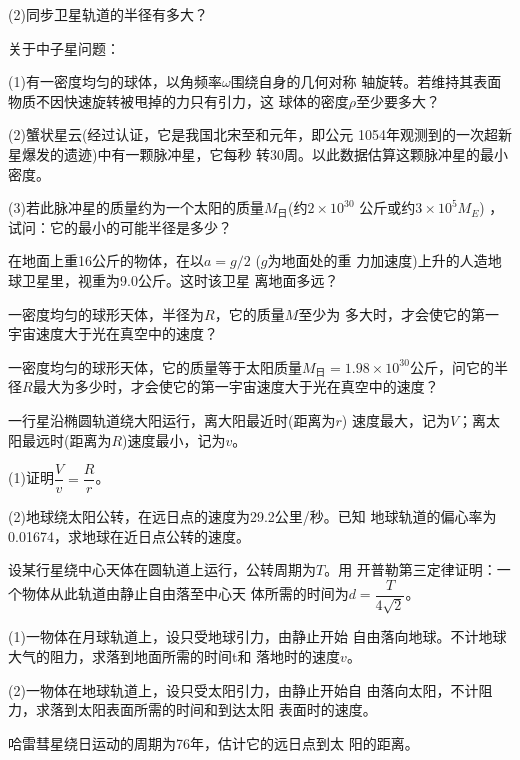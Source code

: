 \begin{exercises}
(2)同步卫星轨道的半径有多大？

\exercise 关于中子星问题：

(1)有一密度均匀的球体，以角频率$ \omega $围绕自身的几何对称
轴旋转。若维持其表面物质不因快速旋转被甩掉的力只有引力，这
球体的密度$ \rho $至少要多大？

(2)蟹状星云(经过认证，它是我国北宋至和元年，即公元
1054年观测到的一次超新星爆发的遗迹)中有一颗脉冲星，它每秒
转30周。以此数据估算这颗脉冲星的最小密度。

(3)若此脉冲星的质量约为一个太阳的质量$ M _ \text{日} $(约$ 2 \times 1 0 ^ { 3 0 } $
公斤或约$ 3 \times 1 0 ^ { 5 } M _ { E } $) ，试问：它的最小的可能半径是多少？

\exercise 在地面上重16公斤的物体，在以$ a = g / 2 $ ($ g $为地面处的重
力加速度)上升的人造地球卫星里，视重为9.0公斤。这时该卫星
离地面多远？

\exercise 一密度均匀的球形天体，半径为$ R $，它的质量$ M $至少为
多大时，才会使它的第一宇宙速度大于光在真空中的速度？

\exercise 一密度均匀的球形天体，它的质量等于太阳质量$ M _ \text{日} =
  1. 9 8 \times 1 0 ^ { 3 0 } $公斤，问它的半径$ R $最大为多少时，才会使它的第一宇宙速度大于光在真空中的速度？

\exercise 一行星沿椭圆轨道绕大阳运行，离大阳最近时(距离为$ r $)
速度最大，记为$ V $；离太阳最远时(距离为$ R $)速度最小，记为$ v $。

(1)证明$ \dfrac { V } { v } = \dfrac { R } { r } $。

(2)地球绕太阳公转，在远日点的速度为29.2公里/秒。已知
地球轨道的偏心率为0.01674，求地球在近日点公转的速度。

\exercise 设某行星绕中心天体在圆轨道上运行，公转周期为$ T $。用
开普勒第三定律证明：一个物体从此轨道由静止自由落至中心天
体所需的时间为$d = \dfrac { T } { 4 \sqrt { 2 } } $。

\exercise (1)一物体在月球轨道上，设只受地球引力，由静止开始
自由落向地球。不计地球大气的阻力，求落到地面所需的时间t和
落地时的速度$ v $。

\clearpage
(2)一物体在地球轨道上，设只受太阳引力，由静止开始自
由落向太阳，不计阻力，求落到太阳表面所需的时间和到达太阳
表面时的速度。

\exercise 哈雷彗星绕日运动的周期为76年，估计它的远日点到太
阳的距离。

\end{exercises}
